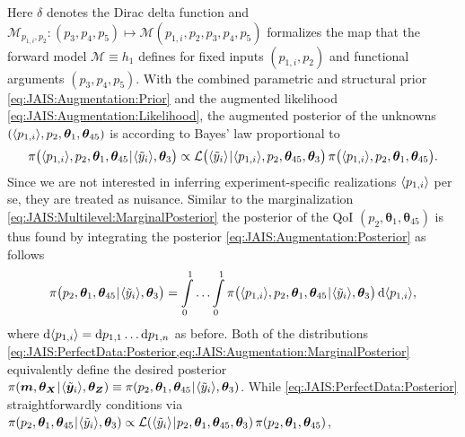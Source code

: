 Here \(\delta\) denotes the Dirac delta function and \(\mathcal{M}_{p_{1,i},p_2} \colon (p_3,p_4,p_5) \mapsto \mathcal{M}(p_{1,i},p_2,p_3,p_4,p_5)\)
formalizes the map that the forward model \(\mathcal{M} \equiv h_1\) defines for fixed inputs \((p_{1,i},p_2)\) and functional arguments \((p_3,p_4,p_5)\).
With the combined parametric and structural prior \cref{eq:JAIS:Augmentation:Prior} and the augmented likelihood \cref{eq:JAIS:Augmentation:Likelihood},
the augmented posterior of the unknowns \((\langle{p_{1,i}}\rangle,p_2,\bm{\theta}_1,\bm{\theta}_{45})\) is according to Bayes' law proportional to
\begin{equation} \label{eq:JAIS:Augmentation:Posterior}
  \pi \big( \langle{p_{1,i}}\rangle,p_2,\bm{\theta}_1,\bm{\theta}_{45} {\:\!}|{\:\!} \langle{\tilde{y}_i}\rangle,\bm{\theta}_3 \big)
  \propto \mathcal{L} \big( \langle{\tilde{y}_i}\rangle {\:\!}|{\:\!} \langle{p_{1,i}}\rangle,p_2,\bm{\theta}_{45},\bm{\theta}_3 \big)
  \, \pi \big( \langle{p_{1,i}}\rangle,p_2,\bm{\theta}_1,\bm{\theta}_{45} \big).
\end{equation}
Since we are not interested in inferring experiment-specific realizations \(\langle{p_{1,i}}\rangle\) per se, they are treated as nuisance.
Similar to the marginalization \cref{eq:JAIS:Multilevel:MarginalPosterior} the posterior of the QoI \((p_2,\bm{\theta}_{1},\bm{\theta}_{45})\)
is thus found by integrating the posterior \cref{eq:JAIS:Augmentation:Posterior} as follows
\begin{equation} \label{eq:JAIS:Augmentation:MarginalPosterior}
  \pi \big( p_2,\bm{\theta}_1,\bm{\theta}_{45} {\:\!}|{\:\!} \langle{\tilde{y}_i}\rangle,\bm{\theta}_3 \big)
  = \int\limits_{0}^{1} \ldots \int\limits_{0}^{1} \pi \big( \langle{p_{1,i}}\rangle,p_2,\bm{\theta}_1,\bm{\theta}_{45} {\:\!}|{\:\!} \langle{\tilde{y}_i}\rangle,\bm{\theta}_3 \big)
  \, \mathrm{d} \langle{p_{1,i}}\rangle,
\end{equation}
where \(\mathrm{d} \langle{p_{1,i}}\rangle = \mathrm{d} p_{1,1} \ldots \mathrm{d} p_{1,n}\) as before.
Both of the distributions \cref{eq:JAIS:PerfectData:Posterior,eq:JAIS:Augmentation:MarginalPosterior} equivalently define the desired posterior
\(\pi(\bm{m},\bm{\theta}_{\bm{X}} {\:\!}|{\:\!} \langle{\tilde{\bm{y}}_i}\rangle,\bm{\theta}_{\bm{Z}}) \equiv \pi(p_2,\bm{\theta}_1,\bm{\theta}_{45} {\:\!}|{\:\!} \langle{\tilde{y}_i}\rangle,\bm{\theta}_3)\).
While \cref{eq:JAIS:PerfectData:Posterior} straightforwardly conditions via
\(\pi(p_2,\bm{\theta}_1,\bm{\theta}_{45} {\:\!}|{\:\!} \langle{\tilde{y}_i}\rangle,\bm{\theta}_3) \propto \mathcal{L}(\langle{\tilde{y}_i}\rangle {\:\!}|{\:\!} p_2,\bm{\theta}_1,\bm{\theta}_{45},\bm{\theta}_3) \, \pi(p_2,\bm{\theta}_1,\bm{\theta}_{45})\),
